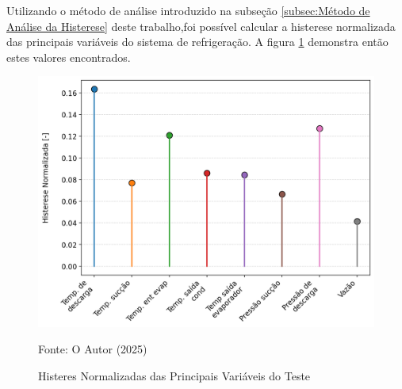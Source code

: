  Utilizando o método de análise introduzido na subseção \ref{subsec:Método de Análise da Histerese} deste trabalho,foi possível  calcular a histerese normalizada das principais variáveis do sistema de refrigeração. A figura \ref{fig:histereses normalizadas} demonstra então estes valores encontrados.
 \newpage
\begin{figure}[h] 

    \centering
    \includegraphics[width=1\linewidth]{FigurasdoTexto/Histereses Normalizadas.png}
    \caption{Histeres Normalizadas das Principais Variáveis do Teste}
    \label{fig:histereses normalizadas}
    {\footnotesize Fonte: O Autor (2025)}
\end{figure}

